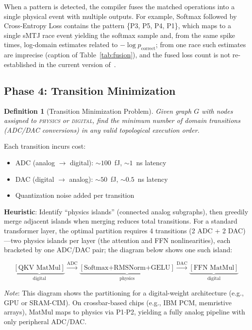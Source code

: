 \documentclass[11pt]{article}
\newtheorem{definition}{Definition}
\begin{document}
When a pattern is detected, the compiler fuses the matched operations into a single physical event with multiple outputs. For example, Softmax followed by Cross-Entropy Loss contains the pattern \{P3, P5, P4, P1\}, which maps to a single sMTJ race event yielding the softmax sample and, from the same spike times, log-domain estimates related to $-\log p_{\text{correct}}$; from one race such estimates are imprecise (caption of Table~\ref{tab:fusion}), and the fused loss count is not re-established in the current version of~\cite{bieg2026}.

\subsection{Phase 4: Transition Minimization}
\label{sec:transitions}

\begin{definition}[Transition Minimization Problem]
Given graph $G$ with nodes assigned to \textsc{physics} or \textsc{digital}, find the minimum number of domain transitions (ADC/DAC conversions) in any valid topological execution order.
\end{definition}

Each transition incurs cost:
\begin{itemize}[leftmargin=*]
\item ADC (analog $\to$ digital): ${\sim}100$~fJ, ${\sim}1$~ns latency
\item DAC (digital $\to$ analog): ${\sim}50$~fJ, ${\sim}0.5$~ns latency
\item Quantization noise added per transition
\end{itemize}

\textbf{Heuristic}: Identify ``physics islands'' (connected analog subgraphs), then greedily merge adjacent islands when merging reduces total transitions. For a standard transformer layer, the optimal partition requires 4 transitions (2 ADC + 2 DAC)---two physics islands per layer (the attention and FFN nonlinearities), each bracketed by one ADC/DAC pair; the diagram below shows one such island:

\begin{equation*}
\underbrace{[\text{QKV MatMul}]}_{\text{digital}} \!\xrightarrow{\text{ADC}}\! \underbrace{[\text{Softmax+RMSNorm+GELU}]}_{\text{physics}} \!\xrightarrow{\text{DAC}}\! \underbrace{[\text{FFN MatMul}]}_{\text{digital}}
\end{equation*}

\noindent\textit{Note}: This diagram shows the partitioning for a digital-weight architecture (e.g., GPU or SRAM-CIM). On crossbar-based chips (e.g., IBM PCM, memristive arrays), MatMul maps to physics via P1$\cdot$P2, yielding a fully analog pipeline with only peripheral ADC/DAC.
\end{document}
